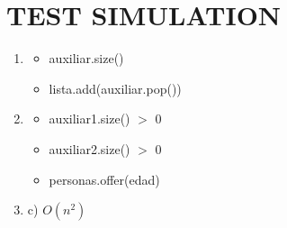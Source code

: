 \documentclass[a4paper,12pt]{article}
\begin{document}
  \section{TEST SIMULATION}
    \begin{enumerate}
      \item \begin{itemize}
        \item auxiliar.size()
        \item lista.add(auxiliar.pop())
    \end{itemize}
      \item \begin{itemize}
        \item auxiliar1.size() $>$ 0
        \item auxiliar2.size() $>$ 0
        \item personas.offer(edad)
    \end{itemize}
    \item c) $O(n^2)$
    \end{enumerate}
\end{document}
